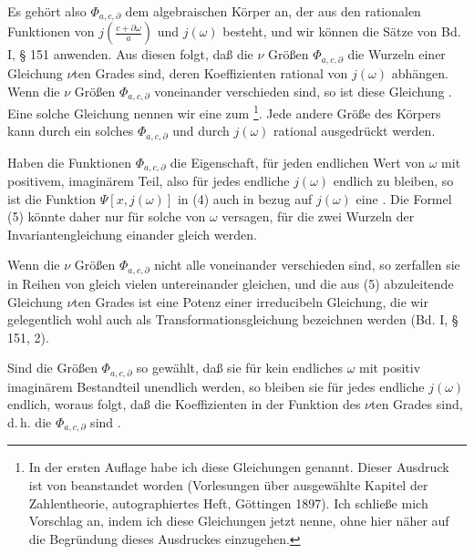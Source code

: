 
Es gehört also $\Phi_{a,c,\partial}$ dem algebraischen Körper an, der
aus den rationalen Funktionen von $j\left(\frac{c+\partial\omega}{a}\right)$
und $j(\omega)$ besteht, und wir können die Sätze von Bd. I, § 151
anwenden. Aus diesen folgt, daß die $\nu$ Größen $\Phi_{a,c,\partial}$
die Wurzeln einer Gleichung $\nu$ten Grades sind, deren Koeffizienten
rational von $j(\omega)$ abhängen. Wenn die $\nu$ Größen
$\Phi_{a,c,\partial}$ voneinander verschieden sind, so ist diese
Gleichung . Eine solche Gleichung nennen wir eine zum
\footnote{In der ersten Auflage habe ich diese Gleichungen
\glqq {}\grqq{} genannt.
Dieser Ausdruck ist von  beanstandet worden
(Vorlesungen über ausgewählte Kapitel der Zahlentheorie,
autographiertes Heft, Göttingen 1897). Ich schließe mich
 Vorschlag an, indem ich diese Gleichungen jetzt
\glqq {}\grqq{} nenne,
ohne hier näher auf die Begründung dieses Ausdruckes einzugehen.}.
Jede andere Größe des Körpers kann durch ein solches
$\Phi_{a,c,\partial}$ und durch $j(\omega)$ rational ausgedrückt
werden.

Haben die Funktionen $\Phi_{a,c,\partial}$ die Eigenschaft, für jeden
endlichen Wert von $\omega$ mit positivem, imaginärem Teil, also für
jedes endliche $j(\omega)$ endlich zu bleiben, so ist die Funktion
$\Psi[x,j(\omega)]$ in (4) auch in bezug auf $j(\omega)$ eine
. Die Formel (5) könnte daher nur für solche
 von $\omega$ versagen, für die zwei Wurzeln der
Invariantengleichung einander gleich werden.

Wenn die $\nu$ Größen $\Phi_{a,c,\partial}$ nicht alle voneinander
verschieden sind, so zerfallen sie in Reihen von gleich vielen
untereinander gleichen, und die aus (5) abzuleitende Gleichung
$\nu$ten Grades ist eine Potenz einer irreducibeln Gleichung, die wir
gelegentlich wohl auch als Transformationsgleichung bezeichnen werden
(Bd. I, § 151, 2).

Sind die Größen $\Phi_{a,c,\partial}$ so gewählt, daß sie für kein
endliches $\omega$ mit positiv imaginärem Bestandteil unendlich
werden, so bleiben sie für jedes endliche $j(\omega)$ endlich, woraus
folgt, daß die Koeffizienten in der Funktion des $\nu$ten Grades
 sind, d.\,h. die
$\Phi_{a,c,\partial}$ sind .
